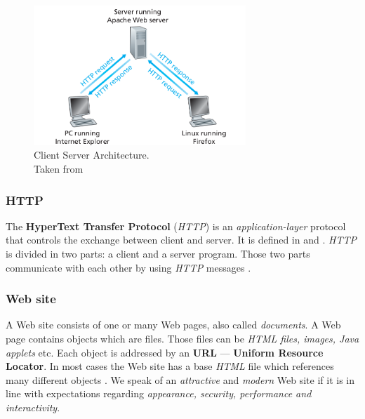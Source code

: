 \documentclass[
  a4paper,               %
  twoside,               %
  headings=small,        %
  DIV=12,                %
  BCOR=1cm,              %
  headinclude=true,      %
  footinclude=true,      %
  numbers=noenddot,      %
  11pt]{scrartcl}        %
\begin{document}
\begin{figure}[h]
  \centerline{\includegraphics[width=8cm]{pics/client_server.png}}
  \caption{Client Server Architecture.\\Taken from \cite{kurose}}
\end{figure}

\subsubsection{HTTP}
The \textbf{HyperText Transfer Protocol} (\textit{HTTP}) is an \textit{application-layer} protocol that controls the exchange between client and server. It is defined in \cite{rfc1945} and \cite{rfc2616}. \textit{HTTP} is divided in two parts: a client and a server program. Those two parts communicate with each other by using \textit{HTTP} messages \cite{kurose}. 

\subsubsection{Web site}
A Web site consists of one or many Web pages, also called \textit{documents}. A Web page contains objects which are files. Those files can be \textit{HTML files, images, Java applets} etc. Each object is addressed by an \textbf{URL} --- \textbf{Uniform Resource Locator}. In most cases the Web site has a base \textit{HTML} file which references many different objects \cite{kurose}. We speak of an \textit{attractive} and \textit{modern} Web site if it is in line with expectations regarding \textit{appearance, security, performance and interactivity}. 
\end{document}

